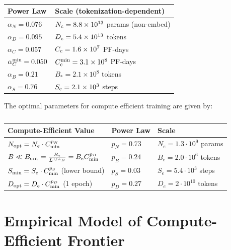 \documentclass[english]{article}
\begin{document}
\begin{table}[h!]
\centering
\vspace{-0.5em}
\begin{tabular}{|l|l|}
\hline 
\textbf{Power Law}  & \textbf{Scale (tokenization-dependent)}\tabularnewline
\hline 
\hline 
$\alpha_{N}=0.076$  & $N_{{\rm c}}=8.8\times10^{13}$ params (non-embed)\tabularnewline
\hline 
$\alpha_{D}=0.095$  & $D_{{\rm c}}=5.4\times10^{13}$ tokens\tabularnewline
\hline 
$\alpha_{C}=0.057$  & $C_{{\rm c}}=1.6\times10^{7}$ PF-days\tabularnewline
\hline 
$\alpha_{C}^{{\rm min}}=0.050$  & $C_{{\rm c}}^{{\rm min}}=3.1\times10^{8}$ PF-days\tabularnewline
\hline 
$\alpha_{B}=0.21$  & $B_{\ast}=2.1\times10^{8}$ tokens\tabularnewline
\hline 
$\alpha_{S}=0.76$  & $S_{{\rm c}}=2.1\times10^{3}$ steps\tabularnewline
\hline 
\end{tabular}
\vspace{0.5em}
\caption[Key parameters to trend fits]{}
\vspace{-1em}
\end{table}

The optimal parameters for compute efficient training are given by:

\begin{table}[h!]
\centering
\vspace{-0.5em}
\begin{tabular}{|l|l|l|}
\hline 
\textbf{Compute-Efficient Value} & \textbf{Power Law} & \textbf{Scale}\tabularnewline
\hline 
\hline 
$N_{{\rm opt}}=N_{e}\cdot C_{{\rm min}}^{p_{N}}$ & $p_{N}=0.73$ & $N_{e}=1.3\cdot10^{9}$ params\tabularnewline
\hline 
$B \ll B_{{\rm crit}}=\frac{B_{\ast}}{L^{1/\alpha_{B}}}=B_{e}C_{{\rm min}}^{p_{B}}$ & $p_{B}=0.24$ & $B_{e}=2.0\cdot10^{6}$ tokens\tabularnewline
\hline 
$S_{{\rm min}}=S_{e}\cdot C_{{\rm min}}^{p_{S}}$ (lower bound) & $p_{S}=0.03$ & $S_{e}=5.4\cdot10^{3}$ steps\tabularnewline
\hline 
$D_{{\rm opt}}=D_{e}\cdot C_{{\rm min}}^{p_{D}}$ (1 epoch) & $p_{D}=0.27$ & $D_{e}=2\cdot10^{10}$ tokens\tabularnewline
\hline 
\end{tabular}
\vspace{0.5em}
\caption[Trends for compute-efficient training]{}
\vspace{-1em}
\end{table}





\section{Empirical Model of Compute-Efficient Frontier}
\label{app:ComputeEfficientTraining}
\end{document}
